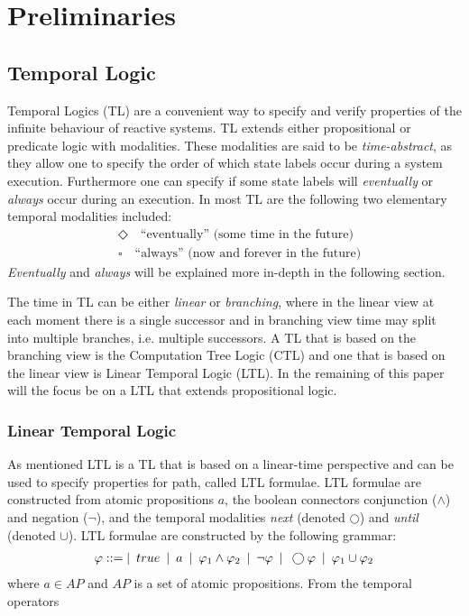 \section{Preliminaries}

\subsection{Temporal Logic}
Temporal Logics (TL) are a convenient way to specify and verify properties of the infinite behaviour of reactive systems. TL extends either propositional or predicate logic with modalities. These modalities are said to be \emph{time-abstract}, as they allow one to specify the order of which state labels occur during a system execution. Furthermore one can specify if some state labels will \emph{eventually} or \emph{always} occur during an execution. In most TL are the following two elementary temporal modalities included\cite{baier2008principles}:
\begin{align*}
    &\Diamond \quad \text{``eventually'' (some time in the future)}\\
    &\square \quad \text{``always'' (now and forever in the future)}
\end{align*}
\emph{Eventually} and \emph{always} will be explained more in-depth in the following section. 

The time in TL can be either \emph{linear} or \emph{branching}, where in the linear view at each moment there is a single successor and in branching view time may split into multiple branches, i.e. multiple successors. A TL that is based on the branching view is the Computation Tree Logic (CTL) and one that is based on the linear view is Linear Temporal Logic (LTL). In the remaining of this paper will the focus be on a LTL that extends propositional logic.

\subsubsection{Linear Temporal Logic}
As mentioned LTL is a TL that is based on a linear-time perspective and can be used to specify properties for path, called LTL formulae. LTL formulae are constructed from atomic propositions $a$, the boolean connectors conjunction ($\land$) and negation ($\neg$), and the temporal modalities \emph{next} (denoted $\bigcirc$) and \emph{until} (denoted $\cup$).
LTL formulae are constructed by the following grammar:
\begin{align*}
    \varphi ::= | \enskip true \enskip | \enskip a \enskip | \enskip \varphi_1 \land \varphi_2 \enskip | \enskip \neg \varphi \enskip | \enskip \bigcirc\varphi \enskip | \enskip \varphi_1 \cup \varphi_2
\end{align*}
where $a \in AP$ and $AP$ is a set of atomic propositions. From the temporal operators 

